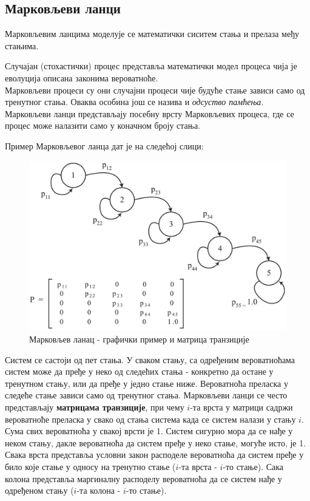 \subsection{Марковљеви ланци}
Марковљевим ланцима моделује се математички сиситем стања и прелаза међу стањима. 
\begin{de}
Случајан (стохастички) процес представља математички модел процеса чија је еволуција описана законима вероватноће. \\
Марковљеви процеси су они случајни процеси чије будуће стање зависи само од тренутног стања. Оваква особина још се назива и \textit{одсуство памћења}. \\
Марковљеви ланци представљају посебну врсту Марковљевих процеса, где се процес може налазити само у коначном броју стања.
\end{de}

Пример Марковљевог ланца дат је на следећој слици:

\begin{figure}[H]
    \centering
\captionsetup{justification=centering}
   \includegraphics[scale=0.8]{./Slike/slika20.png} 
	\caption{Марковљев ланац - графички пример и матрица транзиције} 
	\label{fig:slika20}
\end{figure}

Систем се састоји од пет стања. У сваком стању, са одређеним вероватноћама систем може да пређе у неко од следећих стања - конкретно да остане у тренутном стању, или да пређе у једно стање ниже. Вероватноћа преласка у следеће стање зависи само од тренутног стања. Марковљеви ланци се често представљају \textbf{матрицама транзиције}, при чему $i$-та врста у матрици садржи вероватноће преласка у свако од стања система када се систем налази у стању  $i$. Сума свих вероватноћа у свакој врсти је 1. Систем сигурно мора да се нађе у неком стању, дакле вероватноћа да систем пређе у неко стање, могуће исто, је 1. Свака врста представља условни закон расподеле вероватноћа да систем пређе у било које стање у односу на тренутно стање ($i$-та врста - $i$-то стање). Сака колона представља маргиналну расподелу вероватноћа да се систем нађе у одређеном стању ($i$-та колона - $i$-то стање). 

